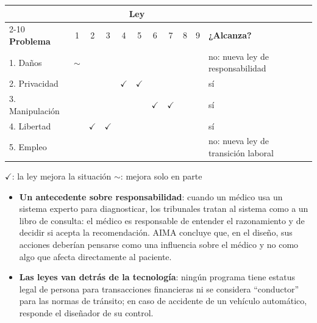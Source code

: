 \documentclass[11pt,a4paper]{article}
\begin{document}
\begin{center}
\small
\begin{tabular}{@{}l *{9}{c} l@{}}
\toprule
 & \multicolumn{9}{c}{\textbf{Ley}} & \\
\cmidrule(lr){2-10}
\textbf{Problema} & 1 & 2 & 3 & 4 & 5 & 6 & 7 & 8 & 9 & \textbf{¿Alcanza?} \\
\midrule
1. Daños & \textcolor{ambar}{$\sim$} & & & & & & & & & no: nueva ley de responsabilidad \\
2. Privacidad & & & & \textcolor{azul}{$\checkmark$} & \textcolor{azul}{$\checkmark$} & & & & & sí \\
3. Manipulación & & & & & & \textcolor{azul}{$\checkmark$} & \textcolor{azul}{$\checkmark$} & & & sí \\
4. Libertad & & \textcolor{azul}{$\checkmark$} & \textcolor{azul}{$\checkmark$} & & & & & & & sí \\
5. Empleo & & & & & & & & & & no: nueva ley de transición laboral \\
\bottomrule
\end{tabular}

\vspace{2pt}
{\scriptsize \textcolor{azul}{$\checkmark$}: la ley mejora la situación \quad \textcolor{ambar}{$\sim$}: mejora solo en parte}
\end{center}

\begin{extras}
\begin{itemize}
  \item \textbf{Un antecedente sobre responsabilidad}: cuando un médico usa un sistema experto para diagnosticar, los tribunales tratan al sistema como a un libro de consulta: el médico es responsable de entender el razonamiento y de decidir si acepta la recomendación. AIMA concluye que, en el diseño, sus acciones deberían pensarse como una influencia sobre el médico y no como algo que afecta directamente al paciente.
  \item \textbf{Las leyes van detrás de la tecnología}: ningún programa tiene estatus legal de persona para transacciones financieras ni se considera ``conductor'' para las normas de tránsito; en caso de accidente de un vehículo automático, responde el diseñador de su control. 
\end{itemize}
\end{extras}
\end{document}
